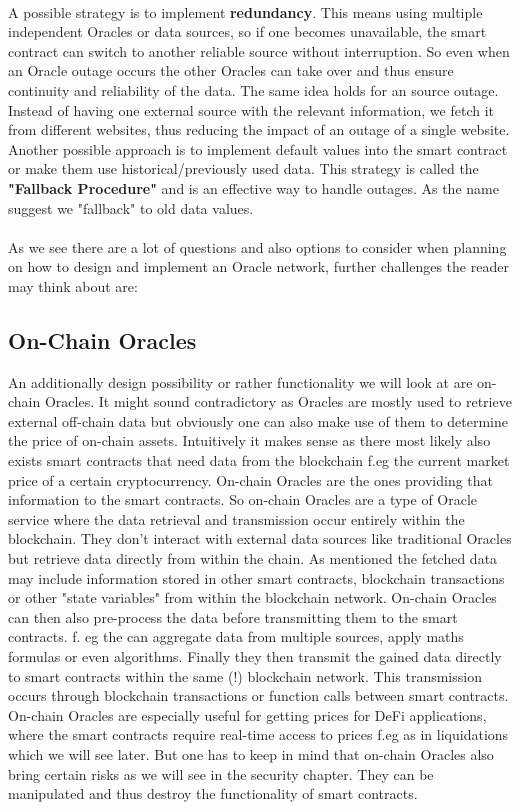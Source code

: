 \documentclass{article}
\begin{document}
\\
A possible strategy is to implement \textbf{redundancy}. This means using multiple independent Oracles or data sources, so if one becomes unavailable, the smart contract can switch to another reliable source without interruption. So even when an Oracle outage occurs the other Oracles can take over and thus ensure continuity and reliability of the data.
The same idea holds for an source outage. Instead of having one external source with the relevant information, we fetch it from different websites, thus reducing the impact of an outage of a single website. Another possible approach is to implement default values into the smart contract or make them use historical/previously used data. This strategy is called the \textbf{"Fallback Procedure"} and is an effective way to handle outages. As the name suggest we "fallback" to old data values.\\
\\
As we see there are a lot of questions and also options to consider when planning on how to design and implement an Oracle network, further challenges the reader may think about are:


\subsection{On-Chain Oracles}
An additionally design possibility or rather functionality we will look at are on-chain Oracles. It might sound contradictory as Oracles are mostly used to retrieve external off-chain data but obviously one can also make use of them to determine the price of on-chain assets. Intuitively it makes sense as there most likely also exists smart contracts that need data from the blockchain f.eg the current market price of a certain cryptocurrency. On-chain Oracles are the ones providing that information to the smart contracts. So on-chain Oracles are a type of Oracle service where the data retrieval and transmission occur entirely within the blockchain. They don't interact with external data sources like traditional Oracles but retrieve data directly from within the chain. As mentioned the fetched data may include information stored in other smart contracts, blockchain transactions or other "state variables" from within the blockchain network. On-chain Oracles can then also pre-process the data before transmitting them to the smart contracts. f. eg the can aggregate data from multiple sources, apply maths formulas or even algorithms. Finally they then transmit the gained data directly to smart contracts within the same (!) blockchain network. This transmission occurs through blockchain transactions or function calls between smart contracts. On-chain Oracles are especially useful for getting prices for DeFi applications, where the smart contracts require real-time access to prices f.eg as in liquidations which we will see later. But one has to keep in mind that on-chain Oracles also bring certain risks as we will see in the security chapter. They can be manipulated and thus destroy the functionality of smart contracts.
\end{document}
